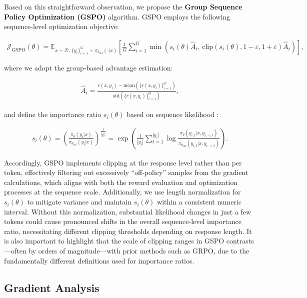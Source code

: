 Based on this straightforward observation, we propose the \textbf{Group Sequence Policy Optimization (GSPO)} algorithm. GSPO employs the following sequence-level optimization objective:

\begin{align}
\mathcal{J}_\text{GSPO} (\theta) =
\mathbb{E}_{ x \sim \mathcal{D},\, \{y_i\}_{i=1}^G \sim \pi_{\theta_\text{old}}( \cdot | x) }
\left[ 
\frac{1}{G} \sum_{i=1}^{G}
\min \left( s_{i}(\theta)  \widehat{A}_{i},  \, \mathrm{clip} \left( s_{i}(\theta), 1 - {\varepsilon}, 1 + {\varepsilon} \right) \widehat{A}_{i} \right) 
\right],
\label{equ:gspo}
\end{align}

where we adopt the group-based advantage estimation:

\begin{align}
\widehat{A}_{i} = \frac{r(x, y_i) - \mathrm{mean} \left( \{ r(x, y_i) \}_{i=1}^G \right) }{ \mathrm{std} \left( \{ r(x, y_i) \}_{i=1}^G \right) },
\end{align}

and define the importance ratio $s_{i}(\theta)$ based on sequence likelihood \citep{click}:

\begin{align}
s_{i}(\theta) = \left( \frac{ \pi_{\theta} (y_i | x) }{ \pi_{\theta_\text{old}} (y_i | x)} \right)^{\frac{1}{|y_i|}}
=
\exp \left( \frac{1}{|y_i|} \sum_{t=1}^{|y_i|} \log \frac{ \pi_{\theta} (y_{i,t} | x, y_{i,<t}) }{ \pi_{\theta_\text{old}} (y_{i,t} | x,y_{i,<t})} \right).
\end{align}

Accordingly, GSPO implements clipping at the response level rather than per token, effectively filtering out excessively ``off-policy'' samples from the gradient calculations, which aligns with both the reward evaluation and optimization processes at the sequence scale. Additionally, we use length normalization for $s_{i}(\theta)$ to mitigate variance and maintain $s_{i}(\theta)$ within a consistent numeric interval. Without this normalization, substantial likelihood changes in just a few tokens could cause pronounced shifts in the overall sequence-level importance ratio, necessitating different clipping thresholds depending on response length. It is also important to highlight that the scale of clipping ranges in GSPO contrasts—often by orders of magnitude—with prior methods such as GRPO, due to the fundamentally different definitions used for importance ratios.

\subsection{Gradient Analysis}
\label{subsec:gradient}

